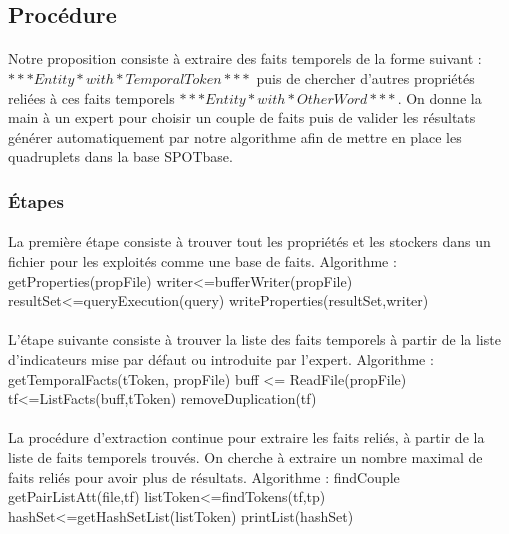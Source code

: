 \subsection*{Procédure}
\paragraph{}
Notre proposition consiste à extraire des faits temporels de la forme suivant :
\newline
$***Entity*with*TemporalToken***$ puis de chercher d’autres propriétés reliées à ces faits temporels $***Entity*with*OtherWord***$.
On donne la main à un expert pour choisir un couple de faits puis de valider les résultats générer automatiquement par notre algorithme afin de mettre en place les quadruplets dans la base SPOTbase. 
\subsubsection{Étapes}
\paragraph{}
La première étape consiste à trouver tout les propriétés et les stockers dans un fichier pour les exploités comme une base de faits.
\newline
Algorithme : getProperties(propFile)			
\newline
writer<=bufferWriter(propFile)
\newline
resultSet<=queryExecution(query)                         
\newline
writeProperties(resultSet,writer)				
\paragraph{}
L'étape suivante consiste à trouver la liste des faits temporels à partir de la liste d'indicateurs mise par défaut ou introduite par l'expert.
\newline
Algorithme : getTemporalFacts(tToken, propFile) 			
\newline
buff <= ReadFile(propFile)    			
\newline
tf<=ListFacts(buff,tToken) 				
\newline
removeDuplication(tf)
\paragraph{}
La procédure d'extraction continue pour extraire les faits reliés, à partir de la liste de faits temporels trouvés. On cherche à extraire un nombre maximal de faits reliés pour avoir plus de résultats.
\newline
Algorithme : findCouple  			
\newline
getPairListAtt(file,tf)
\newline
listToken<=findTokens(tf,tp)   
\newline      
hashSet<=getHashSetList(listToken) 
\newline
printList(hashSet)				
